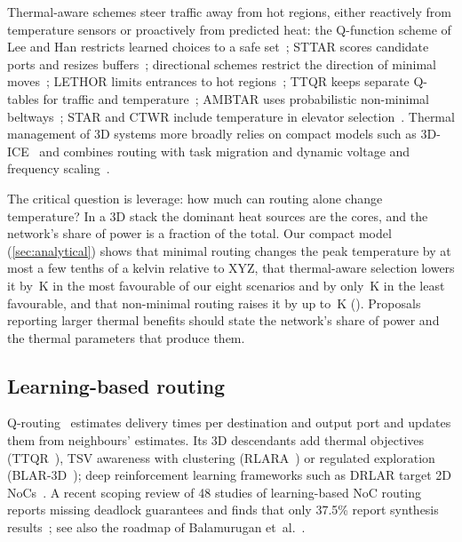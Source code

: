 Thermal-aware schemes steer traffic away from hot regions, either reactively from temperature sensors or proactively from predicted heat: the Q-function scheme of Lee and Han restricts learned choices to a safe set~\cite{lee2020qthermal}; STTAR scores candidate ports and resizes buffers~\cite{fang2022sttar}; directional schemes restrict the direction of minimal moves~\cite{kaleem2022directional}; LETHOR limits entrances to hot regions~\cite{safari2022lethor}; TTQR keeps separate Q-tables for traffic and temperature~\cite{liu2022ttqr}; AMBTAR uses probabilistic non-minimal beltways~\cite{dadmand2025ambtar}; STAR and CTWR include temperature in elevator selection~\cite{ning2026star,ctwr2025}. Thermal management of 3D systems more broadly relies on compact models such as 3D-ICE~\cite{sridhar2010ice} and combines routing with task migration and dynamic voltage and frequency scaling~\cite{huang2024dtm,tang2025migration,chen2023mlthermal}.

The critical question is leverage: how much can routing alone change temperature? In a 3D stack the dominant heat sources are the cores, and the network's share of power is a fraction of the total. Our compact model (\cref{sec:analytical}) shows that minimal routing changes the peak temperature by at most a few tenths of a kelvin relative to XYZ, that thermal-aware selection lowers it by \,K in the most favourable of our eight scenarios and by only \,K in the least favourable, and that non-minimal routing raises it by up to \,K (). Proposals reporting larger thermal benefits should state the network's share of power and the thermal parameters that produce them.

\subsection{Learning-based routing}
\label{sec:rev-learning}

Q-routing~\cite{boyan1994qrouting} estimates delivery times per destination and output port and updates them from neighbours' estimates. Its 3D descendants add thermal objectives (TTQR~\cite{liu2022ttqr}), TSV awareness with clustering (RLARA~\cite{jiao2023rlara}) or regulated exploration (BLAR-3D~\cite{aslan2026blar}); deep reinforcement learning frameworks such as DRLAR target 2D NoCs~\cite{wang2024drlar}. A recent scoping review of 48 studies of learning-based NoC routing reports missing deadlock guarantees and finds that only 37.5\% report synthesis results~\cite{ibarra2026learning}; see also the roadmap of Balamurugan et~al.~\cite{balamurugan2022roadmap}.

